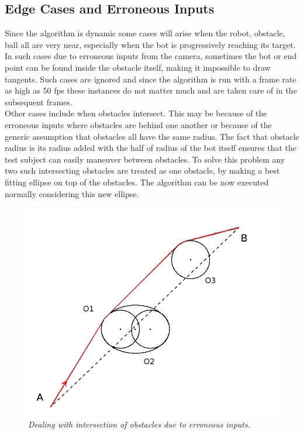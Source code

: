 \documentclass[letterpaper, 10 pt, conference]{ieeeconf}  %
\begin{document}
\subsection{Edge Cases and Erroneous Inputs}
Since the algorithm is dynamic some cases will arise when the robot, obstacle, ball all are very near, especially when the bot is progressively reaching its target. In such cases due to erroneous inputs from the camera, sometimes the bot or end point can be found inside the obstacle itself, making it impossible to draw tangents. Such cases are ignored and since the algorithm is run with a frame rate as high as 50 fps these instances do not matter much and are taken care of in the subsequent frames.
\\ 
Other cases include when obstacles intersect. This may be because of the erroneous inputs where obstacles are behind one another or because of the generic assumption that obstacles all have the same radius. The fact that obstacle radius is its radius added with the half of radius of the bot itself ensures that the test subject can easily maneuver between obstacles. To solve this problem any two such intersecting obstacles are treated as one obstacle, by making a best fitting ellipse on top of the obstacles. The algorithm can be now executed normally considering this new ellipse.

\begin{figure}[h]  
\begin{center}  
\includegraphics[scale=0.3]{intersection1.JPG}  
\caption{\small \sl Dealing with intersection of obstacles due to erroneous inputs.\label{fig: intersection}}  
\end{center}  
\end{figure}
\end{document}
